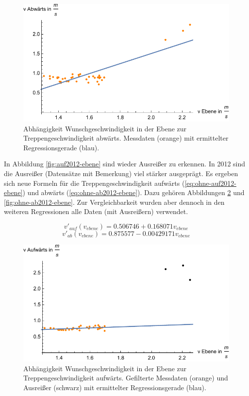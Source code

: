 \begin{figure} \centering 
	\includegraphics[]{abbildungen/regression/2012/ab-ebene.pdf}
	
	\caption{Abhängigkeit Wunschgeschwindigkeit in der Ebene zur Treppengeschwindigkeit abwärts. Messdaten (orange) mit ermittelter Regressionsgerade (blau). \label{fig:ab2012-ebene}}
\end{figure}

In Abbildung \ref{fig:auf2012-ebene} sind wieder Ausreißer zu erkennen. In 2012 sind die Ausreißer (Datensätze mit Bemerkung) viel stärker ausgeprägt. Es ergeben sich neue Formeln für die Treppengeschwindigkeit aufwärts (\ref{eq:ohne-auf2012-ebene}) und abwärts (\ref{eq:ohne-ab2012-ebene}). Dazu gehören Abbildungen \ref{fig:ohne-auf2012-ebene} und \ref{fig:ohne-ab2012-ebene}.
Zur Vergleichbarkeit wurden aber dennoch in den weiteren Regressionen alle Daten (mit Ausreißern) verwendet.


\begin{equation} \label{eq:ohne-auf2012-ebene}
	v'_{auf}(v_{ebene}) = 0.506746 + 0.168071  v_{ebene}
\end{equation}
\begin{equation} \label{eq:ohne-ab2012-ebene}
	v'_{ab}(v_{ebene}) = 0.875577 - 0.00429171 v_{ebene}
\end{equation}

\begin{figure} \centering 
	\includegraphics[]{abbildungen/regression/2012/ohneausreisser/auf-ebene.pdf}
	
	\caption{Abhängigkeit Wunschgeschwindigkeit in der Ebene zur Treppengeschwindigkeit aufwärts. Gefilterte Messdaten (orange) und Ausreißer (schwarz) mit ermittelter Regressionsgerade (blau). \label{fig:ohne-auf2012-ebene}}
\end{figure}

